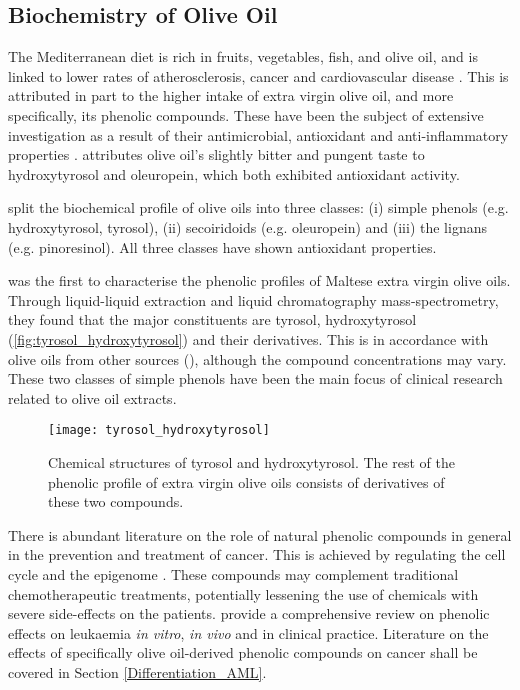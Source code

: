 \subsection{Biochemistry of Olive Oil}
The Mediterranean diet is rich in fruits, vegetables, fish, and olive oil, and is linked to lower rates of atherosclerosis, cancer and cardiovascular disease \citep{owen2000, tripoli2005phenolic, cicerale2012antimicrobial, fabiani2002cancer}. This is attributed in part to the higher intake of extra virgin olive oil, and more specifically, its phenolic compounds. These have been the subject of extensive investigation as a result of their antimicrobial, antioxidant and anti-inflammatory properties \citep{cicerale2012antimicrobial, tripoli2005phenolic, bendini2007phenolic, serreli2018biological}. \cite{tripoli2005phenolic} attributes olive oil's slightly bitter and pungent taste to hydroxytyrosol and oleuropein, which both exhibited antioxidant activity.

\cite{owen2000} split the biochemical profile of olive oils into three classes: (i) simple phenols (e.g. hydroxytyrosol, tyrosol), (ii) secoiridoids (e.g. oleuropein) and (iii) the lignans (e.g. pinoresinol). All three classes have shown antioxidant properties.

\cite{gatt2021first} was the first to characterise the phenolic profiles of Maltese extra virgin olive oils. Through liquid-liquid extraction and liquid chromatography mass-spectrometry, they found that the major constituents are tyrosol, hydroxytyrosol (\autoref{fig:tyrosol_hydroxytyrosol}) and their derivatives. This is in accordance with olive oils from other sources (\citep{Angerosa1995}), although the compound concentrations may vary. These two classes of simple phenols have been the main focus of clinical research related to olive oil extracts.

\begin{figure}[!h]
    \centering
    \texttt{[image: tyrosol\_hydroxytyrosol]}
    \caption[Chemical structures of tyrosol and hydroxytyrosol]{Chemical structures of tyrosol and hydroxytyrosol. The rest of the phenolic profile of extra virgin olive oils consists of derivatives of these two compounds.} 
    \label{fig:tyrosol_hydroxytyrosol}
\end{figure}


There is abundant literature on the role of natural phenolic compounds in general in the prevention and treatment of cancer. This is achieved by regulating the cell cycle \citep{jafari2014role} and the epigenome \citep{pan2015breast}. These compounds may complement traditional chemotherapeutic treatments, potentially lessening the use of chemicals with severe side-effects on the patients. \cite{gatt2021phenolic} provide a comprehensive review on phenolic effects on leukaemia \textit{in vitro}, \textit{in vivo} and in clinical practice. Literature on the effects of specifically olive oil-derived phenolic compounds on cancer shall be covered in Section \ref{Differentiation_AML}.

